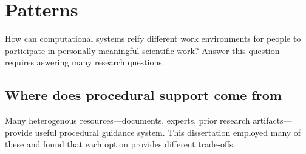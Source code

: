 \section{Patterns} 
How can computational systems reify different work environments for people to participate in personally meaningful scientific work? Answer this question requires aswering many research questions.

\subsection{Where does procedural support come from}
Many heterogenous resources---documents, experts, prior research artifacts---provide useful procedural guidance system. This dissertation employed many of these and found that each option provides different trade-offs.

